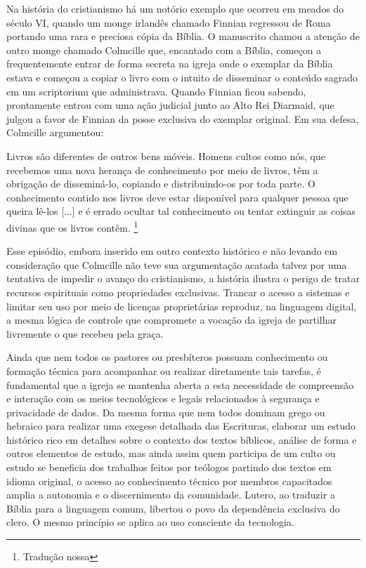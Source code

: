 Na história do cristianismo há um notório exemplo que ocorreu em meados do século VI, quando um monge irlandês chamado Finnian regressou de Roma portando uma rara e preciosa cópia da Bíblia. O manuscrito chamou a atenção de outro monge chamado Colmcille que, encantado com a Bíblia, começou a frequentemente entrar de forma secreta na igreja onde o exemplar da Bíblia estava e começou a copiar o livro com o intuito de disseminar o conteúdo sagrado em um \foreignlanguage{latin}{scriptorium} que administrava. Quando Finnian ficou sabendo, prontamente entrou com uma ação judicial junto ao Alto Rei Diarmaid, que julgou a favor de Finnian da posse exclusiva do exemplar original. Em sua defesa, Colmcille argumentou:

\begin{citacao}
    Livros são diferentes de outros bens móveis. Homens cultos como nós, que recebemos uma nova herança de conhecimento por meio de livros, têm a obrigação de disseminá-lo, copiando e distribuindo-os por toda parte. O conhecimento contido nos livros deve estar disponível para qualquer pessoa que queira lê-los [...] e é errado ocultar tal conhecimento ou tentar extinguir as coisas divinas que os livros contêm. \cite[p.~40-42]{owens_dorean_2021}\footnote{Tradução nossa}
\end{citacao}

Esse episódio, embora inserido em outro contexto histórico e não levando em consideração que Colmcille não teve sua argumentação acatada talvez por uma tentativa de impedir o avanço do cristianismo, a história ilustra o perigo de tratar recursos espirituais como propriedades exclusivas. Trancar o acesso a sistemas e limitar seu uso por meio de licenças proprietárias reproduz, na linguagem digital, a mesma lógica de controle que compromete a vocação da igreja de partilhar livremente o que recebeu pela graça.

Ainda que nem todos os pastores ou presbíteros possuam conhecimento ou formação técnica para acompanhar ou realizar diretamente tais tarefas, é fundamental que a igreja se mantenha aberta a esta necessidade de compreensão e interação com os meios tecnológicos e legais relacionados à segurança e privacidade de dados. Da mesma forma que nem todos dominam grego ou hebraico para realizar uma exegese detalhada das Escrituras, elaborar um estudo histórico rico em detalhes sobre o contexto dos textos bíblicos, análise de forma e outros elementos de estudo, mas ainda assim quem participa de um culto ou estudo se beneficia dos trabalhos feitos por teólogos partindo dos textos em idioma original, o acesso ao conhecimento técnico por membros capacitados amplia a autonomia e o discernimento da comunidade. Lutero, ao traduzir a Bíblia para a linguagem comum, libertou o povo da dependência exclusiva do clero. O mesmo princípio se aplica ao uso consciente da tecnologia.

